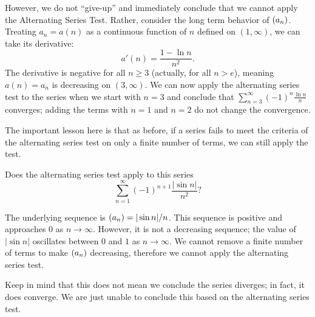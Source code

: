 \documentclass{ximera}
\begin{document}
\begin{question}
\begin{question}
\begin{prompt}
\begin{feedback}
        However, we do not ``give-up'' and immediately conclude that we
        cannot apply the Alternating Series Test. Rather, consider the
        long term behavior of $\left( a_n \right)$. Treating $a_n=a(n)$ as a
        continuous function of $n$ defined on $(1,\infty)$, we can take
        its derivative:
        \[
        a'(n) = \frac{1-\ln n}{n^2}.
        \]
        The derivative is negative for all $n\geq 3$ (actually, for
        all $n>e$), meaning $a(n)=a_n$ is decreasing on
        $(3,\infty)$. We can now apply the alternating series test to
        the series when we start with $n=3$ and conclude that
        $\sum_{n=3}^\infty(-1)^n\frac{\ln n}{n}$ converges; adding the
        terms with $n=1$ and $n=2$ do not change the convergence.
        
        The important lesson here is that as before, if a series fails
        to meet the criteria of the alternating series test on only a
        finite number of terms, we can still apply the test.
      \end{feedback}
    \end{prompt}
    \begin{question}
      Does the alternating series test apply to this series
      \[
      \sum_{n=1}^\infty (-1)^{n+1}\frac{|\sin n|}{n^2}?
      \]
      \begin{prompt}
        \begin{multipleChoice}
        \end{multipleChoice}
        \begin{feedback}
          The underlying sequence is $\left( a_n \right) = |\sin n|/n$. This
          sequence is positive and approaches $0$ as
          $n\to\infty$. However, it is not a decreasing sequence; the
          value of $|\sin n|$ oscillates between $0$ and $1$ as
          $n\to\infty$. We cannot remove a finite number of terms to
          make $\left( a_n \right)$ decreasing, therefore we cannot apply the
          alternating series test.
	  
          Keep in mind that this does not mean we conclude the series
          diverges; in fact, it does converge. We are just unable to
          conclude this based on the alternating series test.
        \end{feedback}
      \end{prompt}
    \end{question}
  \end{question}
\end{question}
\end{document}
